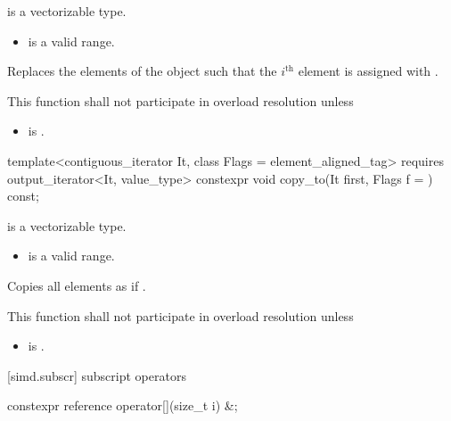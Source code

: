 \begin{itemdescr}
  \pnum\constraints
   is a vectorizable type.

  \pnum\requires
  \begin{itemize}
    \item \tcode{[mem, mem + size())} is a valid range.
  \end{itemize}

  \pnum\effects
  Replaces the elements of the  object such that the $i^\text{th}$ element is assigned with  \foralli.

  \pnum\remarks
  This function shall not participate in overload resolution unless
  \begin{itemize}
    \item {} is .
  \end{itemize}
\end{itemdescr}

\begin{itemdecl}
template<contiguous_iterator It, class Flags = element_aligned_tag>
  requires output_iterator<It, value_type>
  constexpr void copy_to(It first, Flags f = {}) const;
\end{itemdecl}

\begin{itemdescr}
  \pnum\constraints
   is a vectorizable type.

  \pnum\requires
  \begin{itemize}
    \item \tcode{[mem, mem + size())} is a valid range.
  \end{itemize}

  \pnum\effects
  Copies all  elements as if  \foralli.

  \pnum\remarks
  This function shall not participate in overload resolution unless
  \begin{itemize}
    \item {} is .
  \end{itemize}
\end{itemdescr}

[simd.subscr]{ subscript operators}

\begin{itemdecl}
constexpr reference operator[](size_t i) &;
\end{itemdecl}

